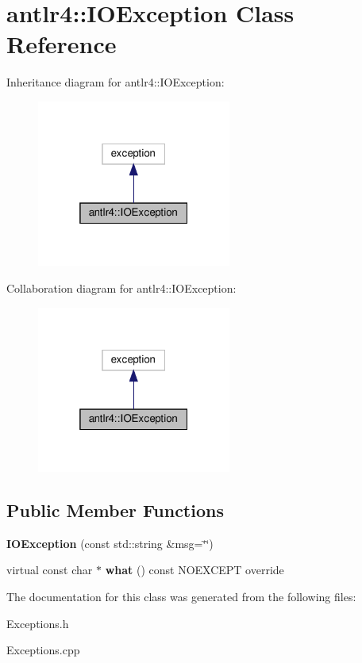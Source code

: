 \hypertarget{classantlr4_1_1IOException}{}\section{antlr4\+:\+:I\+O\+Exception Class Reference}
\label{classantlr4_1_1IOException}


Inheritance diagram for antlr4\+:\+:I\+O\+Exception\+:
\nopagebreak
\begin{figure}[H]
\begin{center}
\leavevmode
\includegraphics[width=181pt]{classantlr4_1_1IOException__inherit__graph}
\end{center}
\end{figure}


Collaboration diagram for antlr4\+:\+:I\+O\+Exception\+:
\nopagebreak
\begin{figure}[H]
\begin{center}
\leavevmode
\includegraphics[width=181pt]{classantlr4_1_1IOException__coll__graph}
\end{center}
\end{figure}
\subsection*{Public Member Functions}
\begin{DoxyCompactItemize}
\item 
\mbox{\label{classantlr4_1_1IOException_a556294c70d3f9791643691d3351b4e2d}} 
{\bfseries I\+O\+Exception} (const std\+::string \&msg=\char`\"{}\char`\"{})
\item 
\mbox{\label{classantlr4_1_1IOException_a16275c3847c1f618be8ddad713b61e60}} 
virtual const char $\ast$ {\bfseries what} () const N\+O\+E\+X\+C\+E\+PT override
\end{DoxyCompactItemize}


The documentation for this class was generated from the following files\+:\begin{DoxyCompactItemize}
\item 
Exceptions.\+h\item 
Exceptions.\+cpp\end{DoxyCompactItemize}
